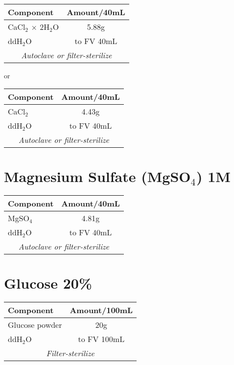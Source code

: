 \documentclass[a4paper,10pt]{article}
\begin{document}
\begin{tabular}{ | l c | }
	\hline
 	\textbf{Component} & \textbf{Amount/40mL} \\
	\hline\hline
	CaCl$_2$ $\times$ 2H$_2$O & 5.88g \\ 
	\hline \hline
	ddH$_2$O & to FV 40mL \\
	\hline \hline
	\multicolumn{2}{|c|}{\textit{Autoclave or filter-sterilize}} \\
	\hline
\end{tabular}

\bigskip
or
\bigskip

\begin{tabular}{ | l c | }
	\hline
 	\textbf{Component} & \textbf{Amount/40mL} \\
	\hline\hline
	CaCl$_2$ & 4.43g \\ 
	\hline \hline
	ddH$_2$O & to FV 40mL \\
	\hline \hline
	\multicolumn{2}{|c|}{\textit{Autoclave or filter-sterilize}} \\
	\hline
\end{tabular}


\section*{Magnesium Sulfate (MgSO$_4$) 1M}

\begin{tabular}{ | l c | }
	\hline
 	\textbf{Component} & \textbf{Amount/40mL} \\
	\hline\hline
	MgSO$_4$ & 4.81g \\ 
	\hline \hline
	ddH$_2$O & to FV 40mL \\
	\hline \hline
	\multicolumn{2}{|c|}{\textit{Autoclave or filter-sterilize}} \\
	\hline
\end{tabular}


\section*{Glucose 20\%}

\begin{tabular}{ | l c | }
	\hline
 	\textbf{Component} & \textbf{Amount/100mL} \\
	\hline\hline
	Glucose powder & 20g \\ 
	\hline \hline
	ddH$_2$O & to FV 100mL \\
	\hline \hline
	\multicolumn{2}{|c|}{\textit{Filter-sterilize}} \\
	\hline
\end{tabular}
\end{document}
